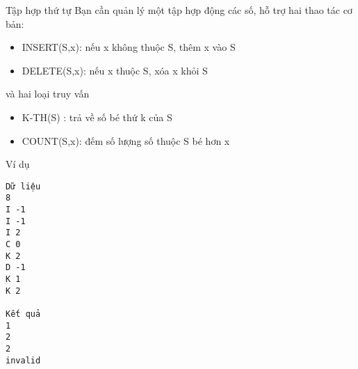 Tập hợp thứ tự
Bạn cần quản lý một tập hợp động các số, hỗ trợ hai thao tác cơ bản:  
\begin{itemize}
	\item     INSERT(S,x): nếu x không thuộc S, thêm x vào S   
	\item     DELETE(S,x): nếu x thuộc S, xóa x khỏi S   
\end{itemize}

   và hai loại truy vấn  
\begin{itemize}
	\item     K-TH(S) : trả về số bé thứ k của S   
	\item     COUNT(S,x): đếm số lượng số thuộc S bé hơn x   
\end{itemize}
Ví dụ
\begin{verbatim}
Dữ liệu
8
I -1
I -1
I 2
C 0
K 2
D -1
K 1
K 2

Kết quả
1
2
2
invalid
\end{verbatim}